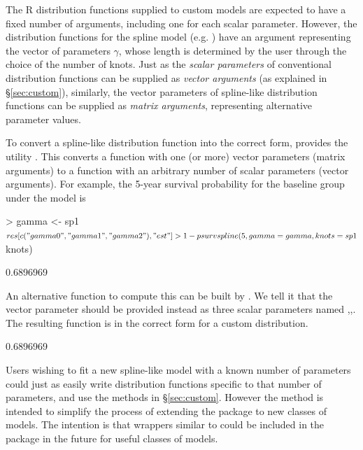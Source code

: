 \documentclass[nojss,nofooter]{jss}
\begin{document}
The R distribution functions supplied to custom models are expected to
have a fixed number of arguments, including one for each scalar
parameter.  However, the distribution functions for the spline model
(e.g. ) have an argument  representing
the vector of parameters $\gamma$, whose length is determined by the
user through the choice of the number of knots.  Just as the
\emph{scalar parameters} of conventional distribution functions can be
supplied as \emph{vector arguments} (as explained in
\S\ref{sec:custom}), similarly, the vector parameters of spline-like
distribution functions can be supplied as \emph{matrix arguments},
representing alternative parameter values.

To convert a spline-like distribution function into the correct form,
 provides the utility .  This
converts a function with one (or more) vector parameters (matrix
arguments) to a function with an arbitrary number of scalar parameters
(vector arguments).  For example, the 5-year survival probability for the baseline group 
under the model  is
\begin{Schunk}
\begin{Sinput}
> gamma <- sp1$res[c("gamma0","gamma1","gamma2"),"est"]
> 1 - psurvspline(5, gamma=gamma, knots=sp1$knots)
\end{Sinput}
\begin{Soutput}
[1] 0.6896969
\end{Soutput}
\end{Schunk}
An alternative function to compute this can be built by .  We tell it that the 
vector parameter  should be provided instead as three scalar parameters
named ,,.  The resulting function 
is in the correct form for a custom  distribution.
\begin{Schunk}
\begin{Soutput}
[1] 0.6896969
\end{Soutput}
\end{Schunk}

Users wishing to fit a new spline-like model with a known number of
parameters could just as easily write distribution functions specific
to that number of parameters, and use the methods in
\S\ref{sec:custom}.  However the  method is
intended to simplify the process of extending the 
package to new classes of models.  The intention is that wrappers
similar to  could be included in the package in
the future for useful classes of models.
\end{document}
